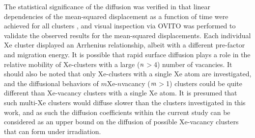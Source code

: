\documentclass[preprint,12pt]{elsarticle}
\providecommand{\DIFadd}[1]{{\protect\color{blue} \sf #1}} %
\providecommand{\DIFaddbegin}{} %
\providecommand{\DIFaddend}{} %
\providecommand{\DIFdelbegin}{} %
\providecommand{\DIFdelend}{} %
\newcommand{\DIFscaledelfig}{0.5}
\newlength{\DIFdelgraphicswidth} %
\newlength{\DIFdelgraphicsheight} %
\newcommand{\DIFaddincludegraphics}[2][]{{\color{blue}\fbox{\DIFOincludegraphics[#1]{#2}}}} %
\newcommand{\DIFdelincludegraphics}[2][]{%
\sbox{\DIFdelgraphicsbox}{\DIFOincludegraphics[#1]{#2}}%
\settoboxwidth{\DIFdelgraphicswidth}{\DIFdelgraphicsbox} %
\settoboxtotalheight{\DIFdelgraphicsheight}{\DIFdelgraphicsbox} %
\scalebox{\DIFscaledelfig}{%
\parbox[b]{\DIFdelgraphicswidth}{\usebox{\DIFdelgraphicsbox}\\[-\baselineskip] \rule{\DIFdelgraphicswidth}{0em}}\llap{\resizebox{\DIFdelgraphicswidth}{\DIFdelgraphicsheight}{%
\setlength{\unitlength}{\DIFdelgraphicswidth}%
\begin{picture}(1,1)%
\thicklines\linethickness{2pt} %
{\color[rgb]{1,0,0}\put(0,0){\framebox(1,1){}}}%
{\color[rgb]{1,0,0}\put(0,0){\line( 1,1){1}}}%
{\color[rgb]{1,0,0}\put(0,1){\line(1,-1){1}}}%
\end{picture}%
}\hspace*{3pt}}} %
} %
\DeclareRobustCommand{\DIFaddbegin}{\DIFOaddbegin \let\includegraphics\DIFaddincludegraphics} %
\DeclareRobustCommand{\DIFaddend}{\DIFOaddend \let\includegraphics\DIFOincludegraphics} %
\DeclareRobustCommand{\DIFdelbegin}{\DIFOdelbegin \let\includegraphics\DIFdelincludegraphics} %
\DeclareRobustCommand{\DIFdelend}{\DIFOaddend \let\includegraphics\DIFOincludegraphics} %
\begin{document}
\DIFaddend \indent The statistical significance of the diffusion was verified in that linear dependencies of the mean-squared displacement as a function of time were achieved for all clusters\DIFaddbegin \DIFadd{, }\DIFaddend and visual inspection via OVITO \cite{stukowski2009visualization} was performed to validate the observed results for the mean-squared displacements. \DIFaddbegin \DIFadd{Each individual Xe cluster displayed an Arrhenius relationship, albeit with a different pre-factor and migration energy. }\DIFaddend It is possible that rapid surface diffusion plays a role in the relative mobility of Xe-clusters with a large ($\it{n}$$>$4) number of vacancies. It should also be noted that only Xe-clusters with a single Xe atom are investigated, and the diffusional behaviors of $m$Xe-$n$vacancy ($\it{m}$$>$1) clusters could be quite different than Xe-vacancy clusters with a single Xe atom. It is presumed that such multi-Xe clusters would diffuse slower than the clusters investigated in this work, and as such the diffusion coefficients within the current study can be considered as an upper bound on the diffusion of possible Xe-vacancy clusters that can form under irradiation. 
\DIFdelbegin %
\DIFdelend \DIFaddbegin 
\end{document}
